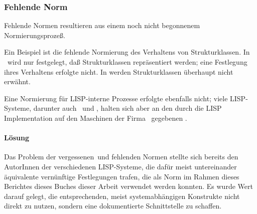\subsubsection{Fehlende Norm}
%
Fehlende Normen resultieren aus einem noch nicht begonnenem
Normierungsproze\ss{}.
%
\par{}Ein Beispiel ist die fehlende Normierung des Verhaltens
von Strukturklassen. In \ wird nur festgelegt, da\ss{}
Strukturklassen repr\"{a}sentiert werden; eine Festlegung ihres
Verhaltens erfolgte nicht. In \cite{bib:amop91} werden
Strukturklassen \"{u}berhaupt nicht erw\"{a}hnt.
%
\par{}Eine Normierung f\"{u}r LISP-interne Prozesse erfolgte ebenfalls
nicht; viele LISP-Systeme, darunter auch \lwcl\ und \allegrocl, halten
sich aber an den durch die LISP Implementation auf den Maschinen der
Firma \symbolics\ gegebenen \std.
%
\paragraph{L\"{o}sung}
Das Problem der \rglq{}vergessenen\rgrq\ und fehlenden Normen stellte
sich bereits den AutorInnen der verschiedenen LISP-Systeme, die
daf\"{u}r meist untereinander \"{a}quivalente vern\"{u}nftige
Festlegungen trafen, die als Norm im Rahmen \ifbericht dieses
Berichtes \else\ifbuch dieses Buches \else dieser Arbeit \fi\fi
verwendet werden konnten. Es wurde Wert darauf gelegt, die
entsprechenden, meist systemabh\"{a}ngigen Konstrukte nicht direkt zu
nutzen, sondern eine dokumentierte Schnittstelle zu schaffen.
%
